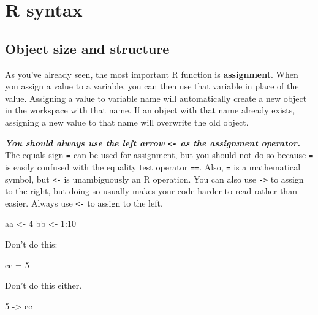 \documentclass[
  13,
  letterpaper,
]{report}
\newenvironment{Shaded}{\begin{snugshade}}{\end{snugshade}}
\newcommand{\DecValTok}[1]{\textcolor[rgb]{0.68,0.00,0.00}{#1}}
\newcommand{\NormalTok}[1]{\textcolor[rgb]{0.00,0.23,0.31}{#1}}
\newcommand{\OtherTok}[1]{\textcolor[rgb]{0.00,0.23,0.31}{#1}}
\newcommand{\SpecialCharTok}[1]{\textcolor[rgb]{0.37,0.37,0.37}{#1}}
\begin{document}
\section{R syntax}\label{sec-r-syn}

\subsection{Object size and structure}\label{sec-r-syn-oss}

As you've already seen, the most important R function is
\textbf{assignment}. When you assign a value to a variable, you can then
use that variable in place of the value. Assigning a value to variable
name will automatically create a new object in the workspace with that
name. If an object with that name already exists, assigning a new value
to that name will overwrite the old object.

\textbf{\emph{You should always use the left arrow \texttt{\textless{}-}
as the assignment operator.}} The equals sign \texttt{=} can be used for
assignment, but you should not do so because \texttt{=} is easily
confused with the equality test operator \texttt{==}. Also, \texttt{=}
is a mathematical symbol, but \texttt{\textless{}-} is unambiguously an
R operation. You can also use \texttt{-\textgreater{}} to assign to the
right, but doing so usually makes your code harder to read rather than
easier. Always use \texttt{\textless{}-} to assign to the left.

\begin{Shaded}
\begin{Highlighting}[]
\NormalTok{aa }\OtherTok{\textless{}{-}} \DecValTok{4}
\NormalTok{bb }\OtherTok{\textless{}{-}} \DecValTok{1}\SpecialCharTok{:}\DecValTok{10}
\end{Highlighting}
\end{Shaded}

Don't do this:

\begin{Shaded}
\begin{Highlighting}[]
\NormalTok{cc }\OtherTok{=} \DecValTok{5}
\end{Highlighting}
\end{Shaded}

Don't do this either.

\begin{Shaded}
\begin{Highlighting}[]
\DecValTok{5} \OtherTok{{-}\textgreater{}}\NormalTok{ cc}
\end{Highlighting}
\end{Shaded}
\end{document}
